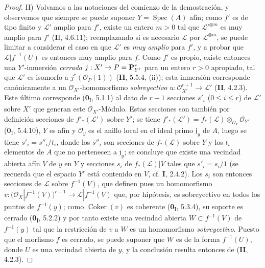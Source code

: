 \documentclass[10pt,oneside,openany]{book}
\theoremstyle{egaenv}\newtheorem*{env}{---}
\theoremstyle{egastatement}
\theoremstyle{egadescription}
\newcommand{\oldpage}[2][]{\marginnote{\normalfont\scriptsize\textbf{#1}\,|\,#2}\ignorespaces}
\renewcommand{\leq}{\leqslant}
\renewcommand{\to}{\mathchoice{\longrightarrow}{\rightarrow}{\rightarrow}{\rightarrow}}
\begin{document}
\begin{proof}
\noindent II) Volvamos a las notaciones del comienzo de la demostración,
y observemos que
\oldpage[III]{146}
siempre se puede suponer $Y=\operatorname{Spec}(A)$
afín; como $f'$ es de tipo finito y $\mathcal L'$ amplio para $f'$,
existe un entero $m>0$ tal que $\mathcal L'^{\otimes m}$ es muy amplio para
$f'$ (\textbf{I}I, 4.6.11); reemplazando si es necesario $\mathcal L$ por
$\mathcal L^{\otimes m}$, se puede limitar a considerar el caso en que
$\mathcal L'$ es \emph{muy amplio} para $f'$, y a probar que
$\mathcal L|f^{-1}(U)$ es entonces muy amplio para $f$. Como $f'$ es propio,
existe entonces una $Y'$-inmersión \emph{cerrada}
$j:X'\to P=\mathbf P_{Y'}^r$ para un entero $r>0$ apropiado, tal que
$\mathcal L'$ es isomorfo a $j^*(\mathcal O_P(1))$ (\textbf{II}, 5.5.4, (ii));
esta inmersión corresponde canónicamente a un $\mathcal O_{X'}$-homomorfismo
\emph{sobreyectivo}
$u:\mathcal O_{X'}^{r+1}\longrightarrow\mathcal L'$
(\textbf{II}, 4.2.3). Este último corresponde (\textbf{0}\textsubscript{I}, 5.1.1) al dato
de $r+1$ secciones $s'_i$ ($0\leq i\leq r$) de $\mathcal L'$ sobre
$X'$ que generan este $\mathcal O_{X'}$-Módulo. Estas secciones son también por
definición secciones de $f'_*(\mathcal L')$ sobre $Y'$; se tiene
$f'_*(\mathcal L')=f_*(\mathcal L)\otimes_{\mathcal O_Y}\mathcal O_{Y'}$
(\textbf{0}\textsubscript{I}, 5.4.10), $Y$ es afín y $\mathcal O_y$ es el anillo
local en el ideal primo $\mathfrak j_y$ de $A$, luego se tiene
$s'_i=s''_i/t_i$, donde los $s''_i$ son secciones de $f_*(\mathcal L)$
sobre $Y$ y los $t_i$ elementos de $A$ que no pertenecen a
$\mathfrak j_y$; se concluye que existe una vecindad abierta afín $V$
de $y$ en $Y$ y secciones $s_i$ de $f_*(\mathcal L)|V$ tales que
$s'_i=s_i/1$ (se recuerda que el espacio $Y'$ está contenido en $V$, cf. \textbf{I},
2.4.2). Los $s_i$ son entonces secciones de $\mathcal L$ sobre
$f^{-1}(V)$, que definen pues un homomorfismo
$v:\bigl(\mathcal O_X|f^{-1}(V)\bigr)^{r+1}
\longrightarrow\mathcal L|f^{-1}(V)$
que, por hipótesis, es sobreyectivo en todos los puntos de $f^{-1}(y)$; como
$\operatorname{Coker}(v)$ es coherente (\textbf{0}\textsubscript{I}, 5.3.4), su
soporte es cerrado (\textbf{0}\textsubscript{I}, 5.2.2) y por tanto existe una
vecindad abierta $W\subset f^{-1}(V)$ de $f^{-1}(y)$ tal que la restricción
de $v$ a $W$ es un homomorfismo \emph{sobreyectivo}. Puesto que el morfismo $f$ es
cerrado, se puede suponer que $W$ es de la forma $f^{-1}(U)$, donde $U$ es una
vecindad abierta de $y$, y la conclusión resulta entonces de (\textbf{II}, 4.2.3).
\end{proof}
\end{document}
